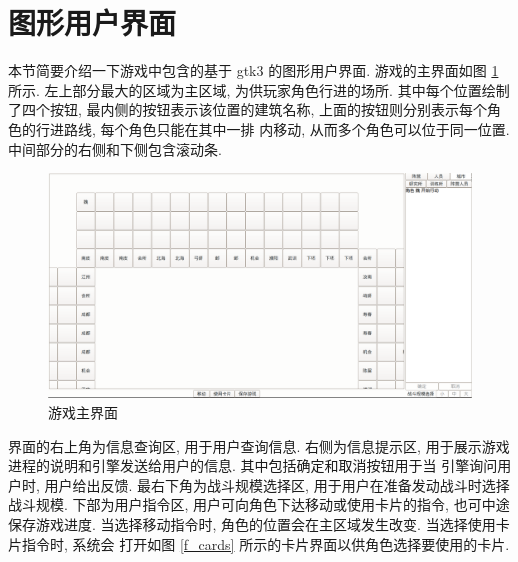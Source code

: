 \documentclass[UTF8, zihao=-4]{ctexart} %
\begin{document}
\section{图形用户界面}
\label{s_gui}
本节简要介绍一下游戏中包含的基于 gtk3 的图形用户界面.
游戏的主界面如图 \ref{f_main} 所示. 左上部分最大的区域为主区域, 为供玩家角色行进的场所.
其中每个位置绘制了四个按钮, 最内侧的按钮表示该位置的建筑名称, 
上面的按钮则分别表示每个角色的行进路线, 每个角色只能在其中一排
内移动, 从而多个角色可以位于同一位置. 中间部分的右侧和下侧包含滚动条.
\begin{figure}
    \centering
    \includegraphics[width=\textwidth]{f_main.png}
    \caption{\label{f_main}游戏主界面}
\end{figure}
界面的右上角为信息查询区, 用于用户查询信息. 
右侧为信息提示区, 用于展示游戏进程的说明和引擎发送给用户的信息. 其中包括确定和取消按钮用于当
引擎询问用户时, 用户给出反馈. 最右下角为战斗规模选择区, 用于用户在准备发动战斗时选择战斗规模.
下部为用户指令区, 用户可向角色下达移动或使用卡片的指令, 也可中途保存游戏进度. 
当选择移动指令时, 角色的位置会在主区域发生改变. 当选择使用卡片指令时, 系统会
打开如图 \ref{f_cards} 所示的卡片界面以供角色选择要使用的卡片.
\end{document}
